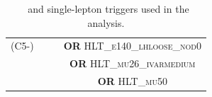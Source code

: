 \begin{table}
\begin{center}
{\begin{tabular}{c c c c}
                (C5-) & & & \textbf{OR} \textsc{HLT\_e140\_lhloose\_nod0} \\
                & & & \textbf{OR} \textsc{HLT\_mu26\_ivarmedium} \\
                & & & \textbf{OR} \textsc{HLT\_mu50} \\         
                \hline
                \hline
            \end{tabular}
        }
    \end{center}
    \caption{\met~and single-lepton triggers used in the analysis.}
    \label{tab:summary_triggers_used}
\end{table}
